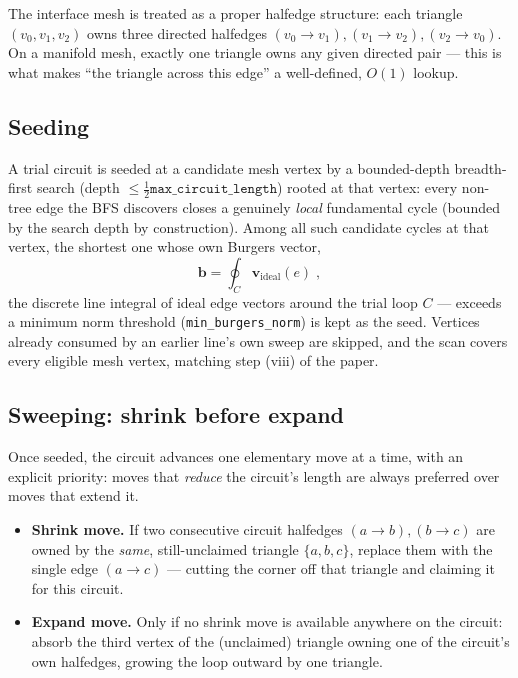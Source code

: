 \documentclass[11pt,a4paper]{article}
\newcommand{\vb}[1]{\boldsymbol{#1}}
\newcommand{\code}[1]{\texttt{#1}}
\begin{document}
The interface mesh is treated as a proper halfedge structure: each triangle $(v_0,v_1,v_2)$ owns
three directed halfedges $(v_0{\to}v_1), (v_1{\to}v_2), (v_2{\to}v_0)$. On a manifold mesh, exactly
one triangle owns any given directed pair — this is what makes ``the triangle across this edge''
a well-defined, $O(1)$ lookup.

\subsection{Seeding}

A trial circuit is seeded at a candidate mesh vertex by a bounded-depth breadth-first search
(depth $\le \tfrac{1}{2}\code{max\_circuit\_length}$) rooted at that vertex: every non-tree edge
the BFS discovers closes a genuinely \emph{local} fundamental cycle (bounded by the search depth by
construction). Among all such candidate cycles at that vertex, the shortest one whose own Burgers
vector,
\begin{equation}
  \vb{b} = \oint_C \vb{v}_{\text{ideal}}(e) \; ,
\end{equation}
the discrete line integral of ideal edge vectors around the trial loop $C$ — exceeds a minimum norm
threshold (\code{min\_burgers\_norm}) is kept as the seed. Vertices already consumed by an earlier
line's own sweep are skipped, and the scan covers every eligible mesh vertex, matching step (viii)
of the paper.

\subsection{Sweeping: shrink before expand}

Once seeded, the circuit advances one elementary move at a time, with an explicit priority: moves
that \emph{reduce} the circuit's length are always preferred over moves that extend it.

\begin{itemize}[nosep]
  \item \textbf{Shrink move.} If two consecutive circuit halfedges $(a{\to}b), (b{\to}c)$ are owned
    by the \emph{same}, still-unclaimed triangle $\{a,b,c\}$, replace them with the single edge
    $(a{\to}c)$ — cutting the corner off that triangle and claiming it for this circuit.
  \item \textbf{Expand move.} Only if no shrink move is available anywhere on the circuit: absorb
    the third vertex of the (unclaimed) triangle owning one of the circuit's own halfedges, growing
    the loop outward by one triangle.
\end{itemize}
\end{document}
